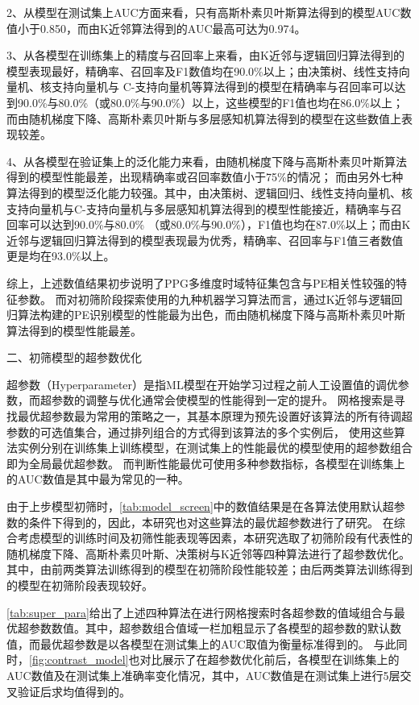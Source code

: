 2、从模型在测试集上AUC方面来看，只有高斯朴素贝叶斯算法得到的模型AUC数值小于0.850，而由K近邻算法得到的AUC最高可达为0.974。

3、从各模型在训练集上的精度与召回率上来看，由K近邻与逻辑回归算法得到的模型表现最好，精确率、召回率及F1数值均在90.0\%以上；由决策树、线性支持向量机、核支持向量机与
C-支持向量机等算法得到的模型在精确率与召回率可以达到90.0\%与80.0\%（或80.0\%与90.0\%）以上，这些模型的F1值也均在86.0\%以上；
而由随机梯度下降、高斯朴素贝叶斯与多层感知机算法得到的模型在这些数值上表现较差。

4、从各模型在验证集上的泛化能力来看，由随机梯度下降与高斯朴素贝叶斯算法得到的模型性能最差，出现精确率或召回率数值小于75\%的情况；
而由另外七种算法得到的模型泛化能力较强。其中，由决策树、逻辑回归、线性支持向量机、核支持向量机与C-支持向量机与多层感知机算法得到的模型性能接近，精确率与召回率可以达到90.0\%与80.0\%
（或80.0\%与90.0\%），F1值也均在87.0\%以上；而由K近邻与逻辑回归算法得到的模型表现最为优秀，精确率、召回率与F1值三者数值更是均在93.0\%以上。

综上，上述数值结果初步说明了PPG多维度时域特征集包含与PE相关性较强的特征参数。
而对初筛阶段探索使用的九种机器学习算法而言，通过K近邻与逻辑回归算法构建的PE识别模型的性能最为出色，而由随机梯度下降与高斯朴素贝叶斯算法得到的模型性能最差。

二、初筛模型的超参数优化

超参数（Hyperparameter）是指ML模型在开始学习过程之前人工设置值的调优参数\cite{scikit-learn,Aurélien2018}，而超参数的调整与优化通常会使模型的性能得到一定的提升。
网格搜索是寻找最优超参数最为常用的策略之一，其基本原理为预先设置好该算法的所有待调超参数的可选值集合，通过排列组合的方式得到该算法的多个实例后，
使用这些算法实例分别在训练集上训练模型，在测试集上的性能最优的模型使用的超参数组合即为全局最优超参数\cite{Aurélien2018}。
而判断性能最优可使用多种参数指标，各模型在训练集上的AUC数值是其中最为常见的一种。

由于上步模型初筛时，\autoref{tab:model_screen}中的数值结果是在各算法使用默认超参数的条件下得到的，因此，本研究也对这些算法的最优超参数进行了研究。
在综合考虑模型的训练时间及初筛性能表现等因素，本研究选取了初筛阶段有代表性的随机梯度下降、高斯朴素贝叶斯、决策树与K近邻等四种算法进行了超参数优化。
其中，由前两类算法训练得到的模型在初筛阶段性能较差；由后两类算法训练得到的模型在初筛阶段表现较好。

\autoref{tab:super_para}给出了上述四种算法在进行网格搜索时各超参数的值域组合与最优超参数数值。其中，超参数组合值域一栏加粗显示了各模型的超参数的默认数值，而最优超参数是以各模型在测试集上的AUC取值为衡量标准得到的。
与此同时，\autoref{fig:contrast_model}也对比展示了在超参数优化前后，各模型在训练集上的AUC数值及在测试集上准确率变化情况，其中，AUC数值是在测试集上进行5层交叉验证后求均值得到的。

